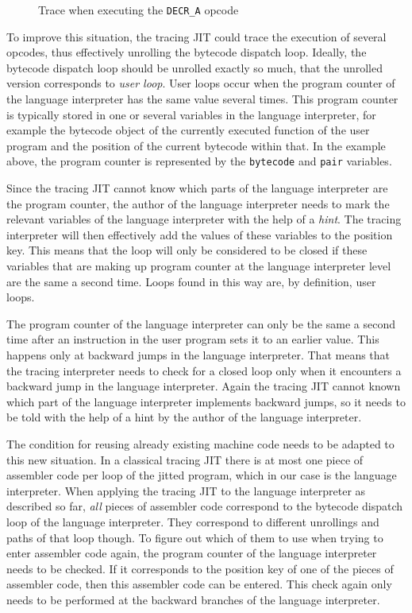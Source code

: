 \documentclass{acm_proc_article-sp}
\begin{document}
\begin{figure}

\caption{Trace when executing the \texttt{DECR\_A} opcode}
\label{fig:trace-normal}
\end{figure}

To improve this situation, the tracing JIT could trace the execution of several
opcodes, thus effectively unrolling the bytecode dispatch loop. Ideally, the
bytecode dispatch loop should be unrolled exactly so much, that the unrolled version
corresponds to \emph{user loop}. User loops
occur when the program counter of the language interpreter has the
same value several times. This program counter is typically stored in one or several
variables in the language interpreter, for example the bytecode object of the
currently executed function of the user program and the position of the current
bytecode within that.  In the example above, the program counter is represented by 
the \texttt{bytecode} and \texttt{pair} variables.

Since the tracing JIT cannot know which parts of the language interpreter are
the program counter, the author of the language interpreter needs to mark the
relevant variables of the language interpreter with the help of a \emph{hint}.
The tracing interpreter will then effectively add the values of these variables
to the position key. This means that the loop will only be considered to be
closed if these variables that are making up program counter at the language
interpreter level are the same a second time.  Loops found in this way are, by
definition, user loops.

The program counter of the language interpreter can only be the same a
second time after an instruction in the user program sets it to an earlier
value. This happens only at backward jumps in the language interpreter. That
means that the tracing interpreter needs to check for a closed loop only when it
encounters a backward jump in the language interpreter. Again the tracing JIT
cannot known which part of the language interpreter implements backward jumps,
so it needs to be told with the help of a hint by the author of the language
interpreter.

The condition for reusing already existing machine code needs to be adapted to
this new situation. In a classical tracing JIT there is at most one piece of
assembler code per loop of the jitted program, which in our case is the language
interpreter. When applying the tracing JIT to the language interpreter as
described so far, \emph{all} pieces of assembler code correspond to the bytecode
dispatch loop of the language interpreter. They correspond to different
unrollings and paths of that loop though. To figure out which of them to use
when trying to enter assembler code again, the program counter of the language
interpreter needs to be checked. If it corresponds to the position key of one of
the pieces of assembler code, then this assembler code can be entered. This
check again only needs to be performed at the backward branches of the language
interpreter.
\end{document}
